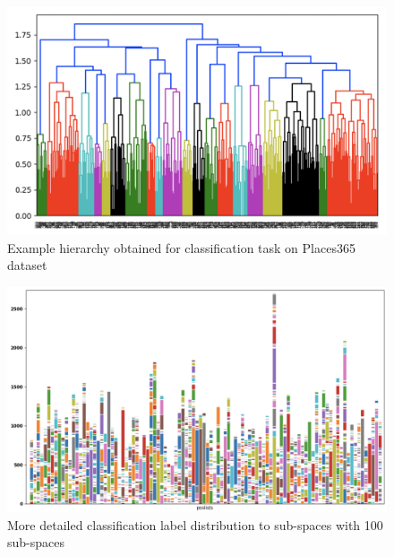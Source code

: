 \begin{figure}
    \centering
    \includegraphics[width=\textwidth]{thesis/images/365class-hierarchy.png}
    \caption{Example hierarchy obtained for classification task on Places365 dataset}
    \label{fig:hier365}
\end{figure}

\begin{figure}
    \includegraphics[width=\textwidth]{thesis/images/100poslists.png}
    \caption{More detailed classification label distribution to sub-spaces with 100 sub-spaces}
    \label{fig:100poslists}
\end{figure}

